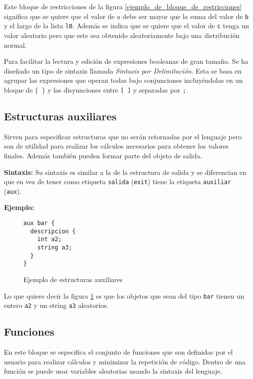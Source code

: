 Este bloque de restricciones de la figura \ref{ejemplo_de_bloque_de_restricciones} 
significa que se quiere que el valor de $a$ debe ser mayor que la suma del valor 
de \texttt{b} y el largo de la lista \texttt{l0}. Además se indica que se quiere que el 
valor de \texttt{c} tenga un valor aleatorio pero que este sea obtenido aleatoriamente
bajo una distribución normal.


\label{sint_delimitacion}
Para facilitar la lectura y edición de expresiones booleanas de gran tamaño. Se ha 
diseñado un tipo de sintaxis llamada \emph{Sintaxis por Delimitación}. Esta se 
basa en agrupar las expresiones que operan todas bajo conjunciones incluyéndolas 
en un bloque de \texttt{$\lbrace$ $\rbrace$} y las disyunciones entre \texttt{[ ]} y 
separadas por \texttt{;}.

\subsection{Estructuras auxiliares}
Sirven para especificar estructuras que no serán retornadas por el lenguaje pero 
son de utilidad para realizar los cálculos necesarios para obtener los valores 
finales. Además también pueden formar parte del objeto de salida. 

\textbf{Sintaxis:} Su sintaxis es similar a la de la estructura de salida y se 
diferencian en que en vez de tener como etiqueta \texttt{salida} (\texttt{exit}) tiene la
etiqueta \texttt{auxiliar} (\texttt{aux}).

\textbf{Ejemplo:}
\begin{figure}[h]
\begin{lstlisting}[mathescape]
aux bar {
  descripcion {
    int a2;
    string a3;
  }
}
\end{lstlisting}
\caption[Ejemplo de estructuras auxiliares]
{Ejemplo de estructuras auxiliares}
\label{ejemplo_de_estructuras_auxiliares}
\end{figure}

Lo que quiere decir la figura \ref{ejemplo_de_estructuras_auxiliares} es que los 
objetos que sean del tipo \texttt{bar} tienen un entero \texttt{a2} y un string 
\texttt{a3} aleatorios.

\subsection{Funciones}
En este bloque se especifica el conjunto de funciones que son definidas por el 
usuario para realizar cálculos y minimizar la repetición de código. Dentro de una 
función se puede usar variables aleatorias usando la sintaxis del lenguaje.

